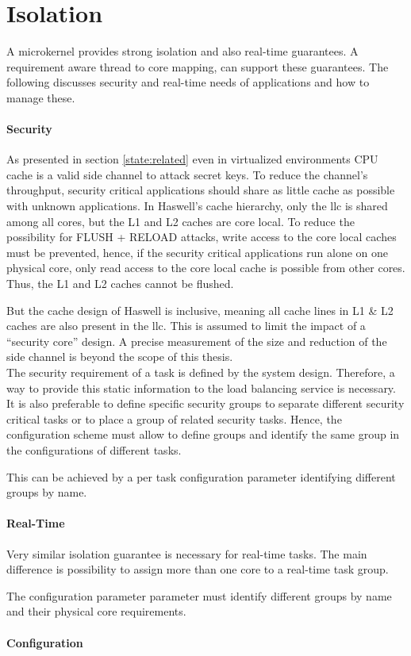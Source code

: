 \section{Isolation}
\label{design:isolation}

A microkernel provides strong isolation and also real-time guarantees.
A requirement aware thread to core mapping, can support these guarantees.
The following discusses security and real-time needs of applications and how to
manage these.

\paragraph{Security}
As presented in section \ref{state:related} even in virtualized environments
CPU cache is a valid side channel to attack secret keys.
To reduce the channel's throughput, security critical applications should share
as little cache as possible with unknown applications.
In Haswell's cache hierarchy, only the \gls{llc} is shared among all cores, but
the L1 and L2 caches are core local.
To reduce the possibility for FLUSH + RELOAD attacks, write access to the core
local caches must be prevented, hence, if the security critical applications
run alone on one physical core, only read access to the core local cache is
possible from other cores.
Thus, the L1 and L2 caches cannot be flushed.

But the cache design of Haswell is inclusive, meaning all cache lines in L1 \&
L2 caches are also present in the \gls{llc}.
This is assumed to limit the impact of a ``security core'' design.
A precise measurement of the size and reduction of the side channel is beyond
the scope of this thesis.
\\

The security requirement of a task is defined by the system design.
Therefore, a way to provide this static information to the load balancing
service is necessary.
It is also preferable to define specific security groups to separate different
security critical tasks or to place a group of related security tasks.
Hence, the configuration scheme must allow to define groups and identify the
same group in the configurations of different tasks.

This can be achieved by a per task configuration parameter identifying
different groups by name.


\paragraph{Real-Time}
Very similar isolation guarantee is necessary for real-time tasks.
The main difference is possibility to assign more than one core to a real-time
task group.

The configuration parameter parameter must identify different groups by name
and their physical core requirements.




\paragraph{Configuration}
